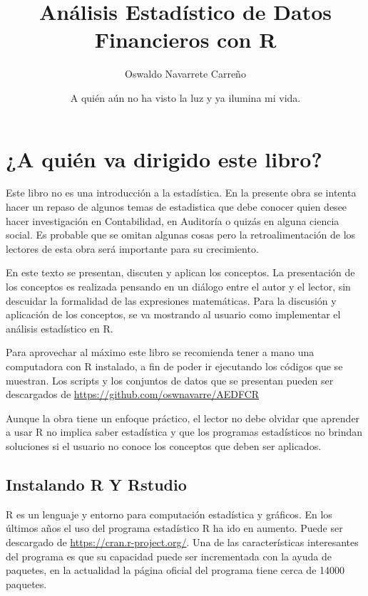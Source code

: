 \documentclass[]{book}
\title{Análisis Estadístico de Datos Financieros con R}
\author{Oswaldo Navarrete Carreño}
\date{A quién aún no ha visto la luz y ya ilumina mi vida.}
\begin{document}
\maketitle

{
\setcounter{tocdepth}{1}
\tableofcontents
}
\chapter{¿A quién va dirigido este
libro?}\label{a-quien-va-dirigido-este-libro}

Este libro no es una introducción a la estadística. En la presente obra
se intenta hacer un repaso de algunos temas de estadistica que debe
conocer quien desee hacer investigación en Contabilidad, en Auditoría o
quizás en alguna ciencia social. Es probable que se omitan algunas cosas
pero la retroalimentación de los lectores de esta obra será importante
para su crecimiento.

En este texto se presentan, discuten y aplican los conceptos. La
presentación de los conceptos es realizada pensando en un diálogo entre
el autor y el lector, sin descuidar la formalidad de las expresiones
matemáticas. Para la discusión y aplicación de los conceptos, se va
mostrando al usuario como implementar el análisis estadístico en R.

Para aprovechar al máximo este libro se recomienda tener a mano una
computadora con R instalado, a fin de poder ir ejecutando los códigos
que se muestran. Los scripts y los conjuntos de datos que se presentan
pueden ser descargados de \url{https://github.com/oswnavarre/AEDFCR}

Aunque la obra tiene un enfoque práctico, el lector no debe olvidar que
aprender a usar R no implica saber estadística y que los programas
estadísticos no brindan soluciones si el usuario no conoce los conceptos
que deben ser aplicados.

\section{Instalando R Y Rstudio}\label{instalando-r-y-rstudio}

R es un lenguaje y entorno para computación estadística y gráficos. En
los últimos años el uso del programa estadístico R ha ido en aumento.
Puede ser descargado de \url{https://cran.r-project.org/}. Una de las
características interesantes del programa es que su capacidad puede ser
incrementada con la ayuda de paquetes, en la actualidad la página
oficial del programa tiene cerca de 14000 paquetes.
\end{document}
